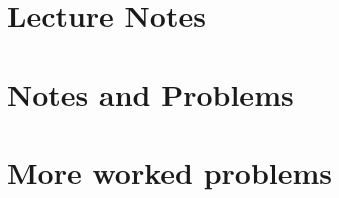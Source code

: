\part{Lecture Notes}
   

\part{Notes and Problems}
   
   
   
   
   
   
   
   
   
   
   
   
   


\part{More worked problems}
   
   
   
   
   
   
   


